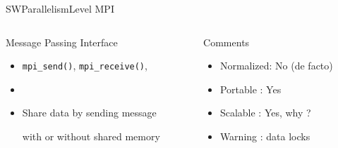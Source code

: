 %
\begin{Frame}{SWParallelismLevel MPI}
  \begin{columns}[t]
    \begin{column}{\HW} %
      \begin{block}{Message Passing Interface}
        \begin{itemize}
        \item \texttt{mpi\_send()}, \texttt{mpi\_receive()}, 
        \item
        \item Share data by sending message

          with or without shared memory
        \end{itemize}
      \end{block} 
    \end{column}
    
    \begin{column}{\HW} %
      \begin{alertblock}{Comments}
        \begin{itemize}
        \item Normalized: No (de facto)
        \item Portable : Yes
        \item Scalable : Yes, why ?
        \item Warning : data locks 
        \end{itemize}
      \end{alertblock}   
    \end{column}
  \end{columns}  
\end{Frame}


